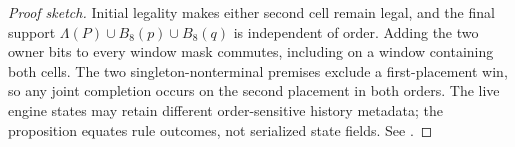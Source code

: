 \begin{proof}[Proof sketch]
Initial legality makes either second cell remain legal, and the final support
$\Lambda(P)\cup B_8(p)\cup B_8(q)$ is independent of order.  Adding the two
owner bits to every window mask commutes, including on a window containing
both cells.  The two singleton-nonterminal premises exclude a first-placement
win, so any joint completion occurs on the second placement in both orders.
The live engine states may retain different order-sensitive history metadata;
the proposition equates rule outcomes, not serialized state fields.  See
\cite{hexobot-companions}.
\end{proof}
